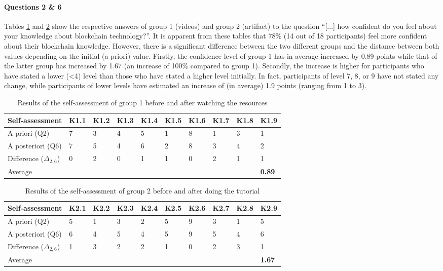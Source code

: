 \paragraph{Questions 2 \& 6} Tables \ref{tab:EvalResultsYesNoVIDEO} and \ref{tab:EvalResultsYesNoTUTORIAL} show the respective answers of group 1 (videos) and group 2 (artifact) to the question \enquote{[...] how confident do you feel about your knowledge about blockchain technology?}.
It is apparent from these tables that 78\% (14 out of 18 participants) feel more confident about their blockchain knowledge. However, there is a significant difference between the two different groups and the distance between both values depending on the initial (a priori) value. Firstly, the confidence level of group 1 has in average increased by 0.89 points while that of the latter group has increased by 1.67 (an increase of 100\% compared to group 1). Secondly, the increase is higher for participants who have stated a lower (<4) level than those who have stated a higher level initially. In fact, participants of level 7, 8, or 9 have not stated any change, while participants of lower levels have estimated an increase of (in average) 1.9 points (ranging from 1 to 3).   


\begin{table}[]
    \centering
    \begin{tabular}{l | l l l l l l l l l }
          Self-assessment & K1.1 & K1.2 & K1.3 & K1.4 & K1.5 & K1.6 & K1.7 & K1.8 & K1.9  \\
         \hline
         A priori (Q2) & 7 & 3 & 4 & 5 & 1 & 8 & 1 & 3 & 1 \\
         A posteriori (Q6) & 7 & 5 & 4 & 6 & 2 & 8 & 3 & 4 & 2 \\
          \hline 
         Difference ($\Delta_{2,6}$) & 0 & 2 & 0 & 1 & 1 & 0 & 2 & 1 & 1 \\
         Average & & & & & & & & & \textbf{0.89} \cellcolor[gray]{0.9} \\
    \end{tabular}
    \caption{Results of the self-assessment of group 1 before and after watching the resources}
    \label{tab:EvalResultsYesNoVIDEO}
\end{table}

\begin{table}[]
    \centering
    \begin{tabular}{l | l l l l l l l l l }
         Self-assessment & K2.1 & K2.2 & K2.3 & K2.4 & K2.5 & K2.6 & K2.7 & K2.8 & K2.9  \\
         \hline
         A priori (Q2) & 5 & 1 & 3 & 2 & 5 & 9 & 3 & 1 & 5 \\
         A posteriori (Q6) & 6 & 4 & 5 & 4 & 5 & 9 & 5 & 4 & 6 \\
         \hline
         Difference ($\Delta_{2,6}$) & 1 & 3 & 2 & 2 & 1 & 0 & 2 & 3 & 1 \\
         Average & & & & & & & & & \cellcolor[gray]{0.9} \textbf{1.67} \\
    \end{tabular}
    \caption{Results of the self-assessment of group 2 before and after doing the tutorial}
    \label{tab:EvalResultsYesNoTUTORIAL}
\end{table}

